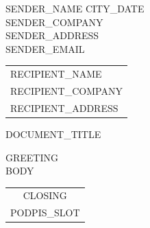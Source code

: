 \documentclass[a4paper,11pt]{article}
\begin{document}
\noindent
{{SENDER_NAME}} \hfill {{CITY_DATE}}\\
{{SENDER_COMPANY}}\\
{{SENDER_ADDRESS}}\\
{{SENDER_EMAIL}}

\vskip 1.0cm

\phantom{a}\hfill
\begin{tabular}[c]{@{}l@{}}
{{RECIPIENT_NAME}}\\
{{RECIPIENT_COMPANY}}\\
{{RECIPIENT_ADDRESS}}
\end{tabular}

\vskip 2.0cm

\begin{center}
{\Large {{DOCUMENT_TITLE}}}
\end{center}

\vskip 0.5cm

\noindent
{{GREETING}}
\\
{{BODY}}

\vskip 1.2cm

\noindent\hspace{\fill}%
\begin{tabular}{@{}c@{}}
{{CLOSING}}\\
{{PODPIS_SLOT}}
\end{tabular}\hspace{1.0cm}
\end{document}
